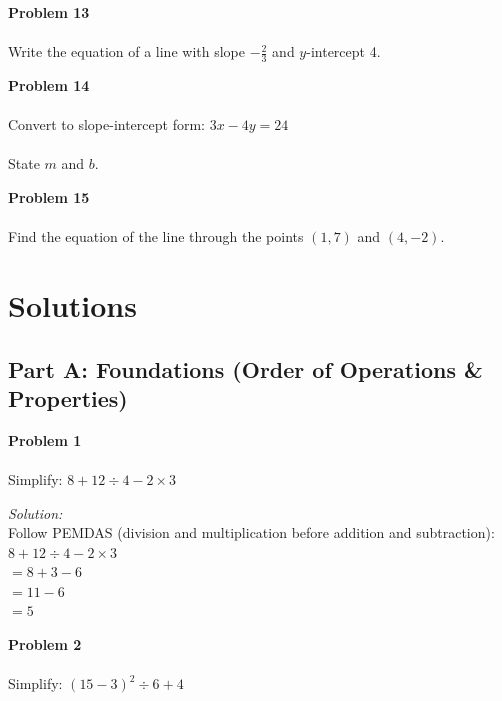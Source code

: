 \documentclass[12pt]{article}
\begin{document}
            \vspace{3cm}

            \textbf{Problem 13}\\\\
            Write the equation of a line with slope $-\displaystyle\frac{2}{3}$ and $y$-intercept 4.

            \vspace{3cm}

            \textbf{Problem 14}\\\\
            Convert to slope-intercept form: $3x - 4y = 24$\\\\
            State $m$ and $b$.

            \vspace{3cm}

            \textbf{Problem 15}\\\\
            Find the equation of the line through the points $(1, 7)$ and $(4, -2)$.

            \newpage

        \section*{Solutions}

            \subsection*{Part A: Foundations (Order of Operations \& Properties)}

            \textbf{Problem 1}\\\\
            Simplify: $8 + 12 \div 4 - 2 \times 3$

            \textit{Solution:}\\
            Follow PEMDAS (division and multiplication before addition and subtraction):\\
            $8 + 12 \div 4 - 2 \times 3$\\
            $= 8 + 3 - 6$\\
            $= 11 - 6$\\
            $= 5$


            \vspace{0.5cm}

            \textbf{Problem 2}\\\\
            Simplify: $(15 - 3)^2 \div 6 + 4$
\end{document}
